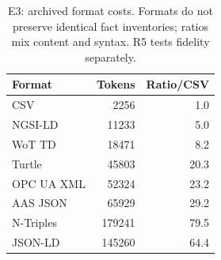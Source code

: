 \begin{table}[t]
\centering\footnotesize
\caption{E3: archived format costs. Formats do not preserve identical fact inventories; ratios mix content and syntax. R5 tests fidelity separately.}
\label{tab:archive-formats}
\setlength{\tabcolsep}{3.5pt}
\begin{tabular}{@{}lrr@{}}
\toprule
Format & Tokens & Ratio/CSV \\
\midrule
CSV & 2256 & 1.0 \\
NGSI-LD & 11233 & 5.0 \\
WoT TD & 18471 & 8.2 \\
Turtle & 45803 & 20.3 \\
OPC UA XML & 52324 & 23.2 \\
AAS JSON & 65929 & 29.2 \\
N-Triples & 179241 & 79.5 \\
JSON-LD & 145260 & 64.4 \\
\bottomrule
\end{tabular}
\end{table}
